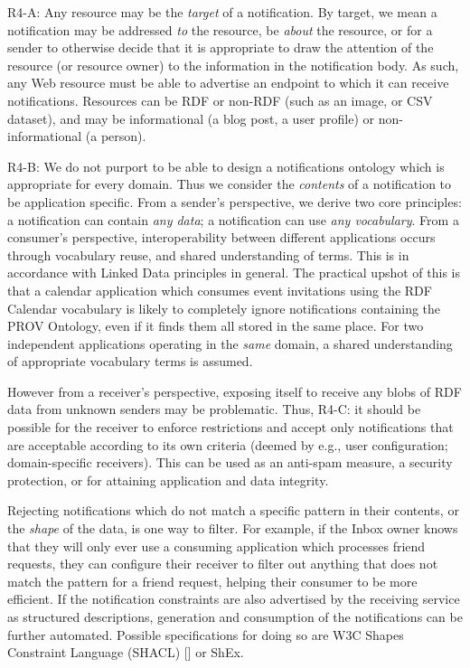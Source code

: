 \documentclass[a4paper]{llncs}
\begin{document}
\par R4-A: Any resource may be the {\em target} of a notification. By target, we mean a notification may be addressed {\em to} the resource, be {\em about} the resource, or for a sender to otherwise decide that it is appropriate to draw the attention of the resource (or resource owner) to the information in the notification body. As such, any Web resource must be able to advertise an endpoint to which it can receive notifications. Resources can be RDF or non-RDF (such as an image, or CSV dataset), and may be informational (a blog post, a user profile) or non-informational (a person).


\par R4-B: We do not purport to be able to design a notifications ontology which is appropriate for every domain. Thus we consider the {\em contents} of a notification to be application specific. From a sender’s perspective, we derive two core principles: a notification can contain {\em any data}; a notification can use {\em any vocabulary}. From a consumer’s perspective, interoperability between different applications occurs through vocabulary reuse, and shared understanding of terms. This is in accordance with Linked Data principles in general. The practical upshot of this is that a calendar application which consumes event invitations using the \empty RDF Calendar vocabulary is likely to completely ignore notifications containing the \empty PROV Ontology, even if it finds them all stored in the same place. For two independent applications operating in the {\em same} domain, a shared understanding of appropriate vocabulary terms is assumed.



\par However from a receiver’s perspective, exposing itself to receive any blobs of RDF data from unknown senders may be problematic. Thus, R4-C: it should be possible for the receiver to enforce restrictions and accept only notifications that are acceptable according to its own criteria (deemed by e.g., user configuration; domain-specific receivers). This can be used as an anti-spam measure, a security protection, or for attaining application and data integrity.


\par Rejecting notifications which do not match a specific pattern in their contents, or the {\em shape} of the data, is one way to filter. For example, if the Inbox owner knows that they will only ever use a consuming application which processes friend requests, they can configure their receiver to filter out anything that does not match the pattern for a friend request, helping their consumer to be more efficient. If the notification constraints are also advertised by the receiving service as structured descriptions, generation and consumption of the notifications can be further automated. Possible specifications for doing so are W3C \empty Shapes Constraint Language (SHACL) [] or \empty ShEx.
\end{document}
